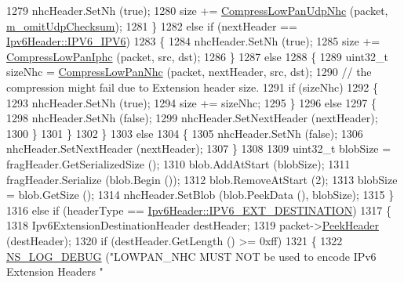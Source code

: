 \begin{DoxyCode}
1279               nhcHeader.SetNh (\textcolor{keyword}{true});
1280               size += \hyperlink{classns3_1_1SixLowPanNetDevice_aa163cb1c6e2c82e208692f9bae9b5189}{CompressLowPanUdpNhc} (packet, 
      \hyperlink{classns3_1_1SixLowPanNetDevice_aa3503adbbb86b19e4ec2d17f3c8436f7}{m\_omitUdpChecksum});
1281             \}
1282           \textcolor{keywordflow}{else} \textcolor{keywordflow}{if} (nextHeader == \hyperlink{classns3_1_1Ipv6Header_a226429221a066c5e3b1f260caf27d1e9a2438a09074916d0e066627b28543ec7a}{Ipv6Header::IPV6\_IPV6})
1283             \{
1284               nhcHeader.SetNh (\textcolor{keyword}{true});
1285               size += \hyperlink{classns3_1_1SixLowPanNetDevice_a67bf1501ba018d90c5bdb442371a3722}{CompressLowPanIphc} (packet, src, dst);
1286             \}
1287           \textcolor{keywordflow}{else}
1288             \{
1289               uint32\_t sizeNhc = \hyperlink{classns3_1_1SixLowPanNetDevice_a41d34fd1612e7e6911614fadfef6ab67}{CompressLowPanNhc} (packet, nextHeader, src, dst);
1290               \textcolor{comment}{// the compression might fail due to Extension header size.}
1291               \textcolor{keywordflow}{if} (sizeNhc)
1292                 \{
1293                   nhcHeader.SetNh (\textcolor{keyword}{true});
1294                   size += sizeNhc;
1295                 \}
1296               \textcolor{keywordflow}{else}
1297                 \{
1298                   nhcHeader.SetNh (\textcolor{keyword}{false});
1299                   nhcHeader.SetNextHeader (nextHeader);
1300                 \}
1301             \}
1302         \}
1303       \textcolor{keywordflow}{else}
1304         \{
1305           nhcHeader.SetNh (\textcolor{keyword}{false});
1306           nhcHeader.SetNextHeader (nextHeader);
1307         \}
1308 
1309       uint32\_t blobSize = fragHeader.GetSerializedSize ();
1310       blob.AddAtStart (blobSize);
1311       fragHeader.Serialize (blob.Begin ());
1312       blob.RemoveAtStart (2);
1313       blobSize = blob.GetSize ();
1314       nhcHeader.SetBlob (blob.PeekData (), blobSize);
1315     \}
1316   \textcolor{keywordflow}{else} \textcolor{keywordflow}{if} (headerType == \hyperlink{classns3_1_1Ipv6Header_a226429221a066c5e3b1f260caf27d1e9abfe6e82da1c9945685a3bf9dbfbe974b}{Ipv6Header::IPV6\_EXT\_DESTINATION})
1317     \{
1318       Ipv6ExtensionDestinationHeader destHeader;
1319       packet->\hyperlink{classns3_1_1Packet_aadc63487bea70945c418f4c3e9b81964}{PeekHeader} (destHeader);
1320       \textcolor{keywordflow}{if} (destHeader.GetLength () >= 0xff)
1321         \{
1322           \hyperlink{group__logging_ga413f1886406d49f59a6a0a89b77b4d0a}{NS\_LOG\_DEBUG} (\textcolor{stringliteral}{"LOWPAN\_NHC MUST NOT be used to encode IPv6 Extension Headers "}

\end{DoxyCode}
